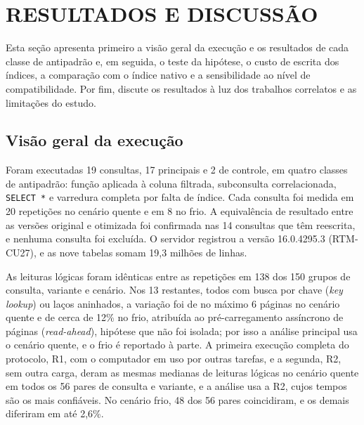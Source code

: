 
\section{RESULTADOS E DISCUSSÃO}\label{sec:rd}

Esta seção apresenta primeiro a visão geral da execução e os resultados de cada classe de antipadrão e, em seguida, o teste da hipótese, o custo de escrita dos índices, a comparação com o índice nativo e a sensibilidade ao nível de compatibilidade. Por fim, discute os resultados à luz dos trabalhos correlatos e as limitações do estudo.

\subsection{Visão geral da execução}\label{sec:visao}

Foram executadas 19 consultas, 17 principais e 2 de controle, em quatro classes de antipadrão: função aplicada à coluna filtrada, subconsulta correlacionada, \texttt{SELECT *} e varredura completa por falta de índice. Cada consulta foi medida em 20 repetições no cenário quente e em 8 no frio. A equivalência de resultado entre as versões original e otimizada foi confirmada nas 14 consultas que têm reescrita, e nenhuma consulta foi excluída. O servidor registrou a versão 16.0.4295.3 (RTM-CU27), e as nove tabelas somam 19,3 milhões de linhas.

As leituras lógicas foram idênticas entre as repetições em 138 dos 150 grupos de consulta, variante e cenário. Nos 13 restantes, todos com busca por chave (\textit{key lookup}) ou laços aninhados, a variação foi de no máximo 6 páginas no cenário quente e de cerca de 12\% no frio, atribuída ao pré-carregamento assíncrono de páginas (\textit{read-ahead}), hipótese que não foi isolada; por isso a análise principal usa o cenário quente, e o frio é reportado à parte. A primeira execução completa do protocolo, R1, com o computador em uso por outras tarefas, e a segunda, R2, sem outra carga, deram as mesmas medianas de leituras lógicas no cenário quente em todos os 56 pares de consulta e variante, e a análise usa a R2, cujos tempos são os mais confiáveis. No cenário frio, 48 dos 56 pares coincidiram, e os demais diferiram em até 2,6\%.

